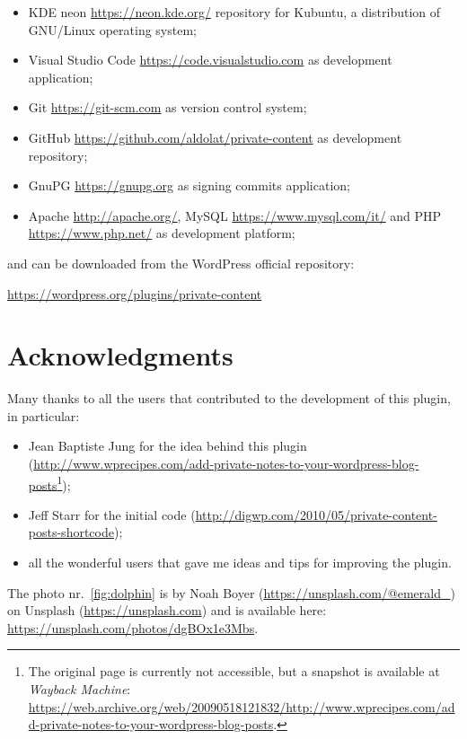 	\begin{itemize}
		\item KDE neon \url{https://neon.kde.org/} repository for Kubuntu, a
		distribution of GNU/Linux operating system;
		\item Visual Studio Code \url{https://code.visualstudio.com} as
		development application;
		\item Git \url{https://git-scm.com} as version control system;
		\item GitHub \url{https://github.com/aldolat/private-content} as
		development repository;
		\item GnuPG \url{https://gnupg.org} as signing commits application;
		\item Apache \url{http://apache.org/}, MySQL
		\url{https://www.mysql.com/it/} and PHP \url{https://www.php.net/} as
		development platform;
	\end{itemize}

	\noindent and can be downloaded from the WordPress official repository:
	\begin{center}
	\url{https://wordpress.org/plugins/private-content}
	\end{center}

	\section*{Acknowledgments}

	Many thanks to all the users that contributed to the development of this
	plugin, in particular:

	\begin{itemize}
		\item Jean Baptiste Jung for the idea behind this plugin
		(\url{http://www.wprecipes.com/add-private-notes-to-your-wordpress-blog-posts}\footnote{The
		original page is currently not accessible, but a snapshot is available
		at \emph{Wayback Machine}:
		\url{https://web.archive.org/web/20090518121832/http://www.wprecipes.com/add-private-notes-to-your-wordpress-blog-posts}.});
		\item Jeff Starr for the initial code
		(\url{http://digwp.com/2010/05/private-content-posts-shortcode});
		\item all the wonderful users that gave me ideas and tips for improving
		the plugin.
	\end{itemize}

	\noindent The photo nr.~\vref{fig:dolphin} is by Noah Boyer
	(\url{https://unsplash.com/@emerald_}) on Unsplash
	(\url{https://unsplash.com}) and is available here:
	\url{https://unsplash.com/photos/dgBOx1e3Mbs}.

\endgroup